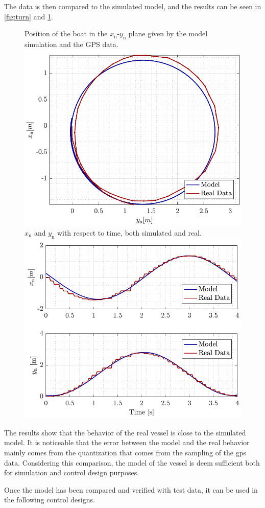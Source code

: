 The data is then compared to the simulated model, and the results can be seen in \autoref{fig:turn} and \ref{fig:turn_time}.

\begin{figure}[H]
    \captionbox 
    {   
        Position of the boat in the $x_\mathrm{n}$-$y_\mathrm{n}$ plane given by the model simulation and the GPS data.
        \label{fig:turn}
    }                                                                 
    {                                                                  
        \includegraphics[width=.45\textwidth]{figures/turn}         
    }                                                                    
    \hspace{5pt}                                                          
    \captionbox  
    {      
        $x_\mathrm{n}$ and $y_\mathrm{n}$ with respect to time, both simulated and real.
        \label{fig:turn_time}
    }                                                                          
    {
        \includegraphics[width=.45\textwidth]{figures/turn_time}
    }
\end{figure}

The results show that the behavior of the real vessel is close to the simulated model. It is noticeable that the error between the model and the  real behavior mainly comes from the quantization that comes from the sampling of the gps data. Considering this comparison, the model of the vessel is deem sufficient both for simulation and control design purposes. 

Once the model has been compared and verified with test data, it can be used in the following control designs.